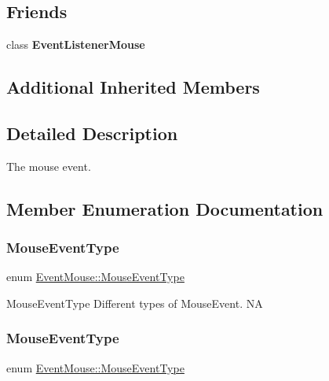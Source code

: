 \subsection*{Friends}
\begin{DoxyCompactItemize}
\item 
\mbox{\label{classEventMouse_ad3508f7b8d6c7a288852ab6ded4991d3}} 
class {\bfseries Event\+Listener\+Mouse}
\end{DoxyCompactItemize}
\subsection*{Additional Inherited Members}


\subsection{Detailed Description}
The mouse event. 

\subsection{Member Enumeration Documentation}
\mbox{\label{classEventMouse_a6a96ce5df8674cbaf01b74d2f17f213c}} 
\subsubsection{\texorpdfstring{Mouse\+Event\+Type}{MouseEventType}\hspace{0.1cm}{\footnotesize\ttfamily [1/2]}}
{\footnotesize\ttfamily enum \hyperlink{classEventMouse_a6a96ce5df8674cbaf01b74d2f17f213c}{Event\+Mouse\+::\+Mouse\+Event\+Type}\hspace{0.3cm}{\ttfamily [strong]}}

Mouse\+Event\+Type Different types of Mouse\+Event.  NA \mbox{\label{classEventMouse_a6a96ce5df8674cbaf01b74d2f17f213c}} 
\subsubsection{\texorpdfstring{Mouse\+Event\+Type}{MouseEventType}\hspace{0.1cm}{\footnotesize\ttfamily [2/2]}}
{\footnotesize\ttfamily enum \hyperlink{classEventMouse_a6a96ce5df8674cbaf01b74d2f17f213c}{Event\+Mouse\+::\+Mouse\+Event\+Type}\hspace{0.3cm}{\ttfamily [strong]}}

